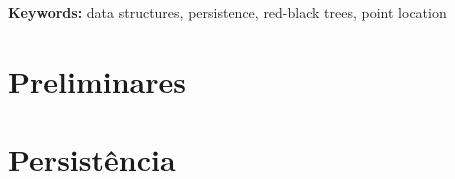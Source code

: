 \documentclass[11pt,oneside,a4paper, openany]{book}
\begin{document}
\noindent \textbf{Keywords:} data structures, persistence, red-black trees, point location


\setcounter{tocdepth}{1}

\begingroup
\let\cleardoublepage\clearpage
\tableofcontents
\endgroup

\mainmatter
{}

\part{Preliminares}






\part{Persistência}













%
%
%





\end{document}
